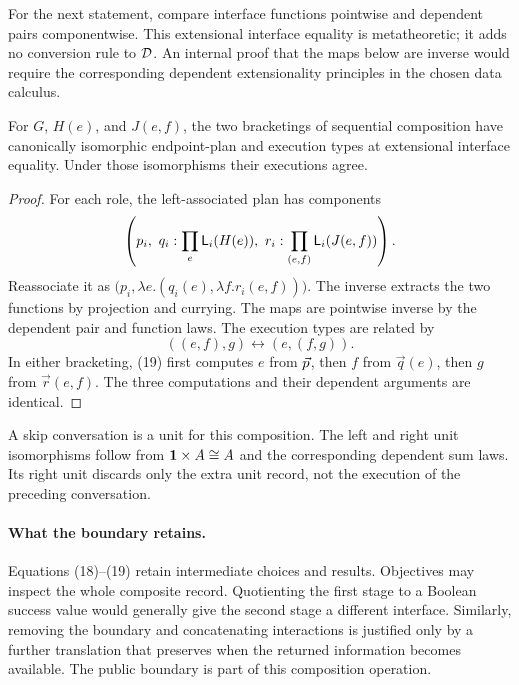 For the next statement, compare interface functions pointwise and dependent
pairs componentwise. This extensional interface equality is metatheoretic;
it adds no conversion rule to $\mathcal D$. An internal proof that the maps below are
inverse would require the corresponding dependent extensionality principles
in the chosen data calculus.

\begin{theorem}
\label{thm:associativity}
For $G$, $H(e)$, and $J(e,f)$, the two bracketings of sequential composition
have canonically isomorphic endpoint-plan and execution types at extensional
interface equality. Under those isomorphisms their executions agree.
\end{theorem}
\begin{proof}
For each role, the left-associated plan has components
\[
 \left(p_i,\ q_i:\prod_e\Local{i}{H(e)},\
                  r_i:\prod_{(e,f)}\Local{i}{J(e,f)}\right).
\]
Reassociate it as
$\bigl(p_i,\lambda e.(q_i(e),\lambda f.r_i(e,f))\bigr)$.
The inverse extracts the two functions by projection and currying. The maps
are pointwise inverse by the dependent pair and function laws. The execution types are
related by
\[
 ((e,f),g)\longleftrightarrow(e,(f,g)).
\]
In either bracketing, (19) first computes $e$ from $\vec p$, then $f$ from
$\vec q(e)$, then $g$ from $\vec r(e,f)$. The three computations and their
dependent arguments are identical.
\end{proof}

A skip conversation is a unit for this composition. The left and
right unit isomorphisms follow from $\mathbf 1\times A\cong A$ and the
corresponding dependent sum laws. Its right unit discards only the extra unit
record, not the execution of the preceding conversation.

\paragraph{What the boundary retains.}
Equations (18)--(19) retain intermediate choices and results. Objectives may
inspect the whole composite record. Quotienting the first stage to a Boolean
success value would generally give the second stage a different interface.
Similarly, removing the boundary and concatenating interactions is justified
only by a further translation that preserves when the returned information
becomes available. The public boundary is part of this composition operation.

